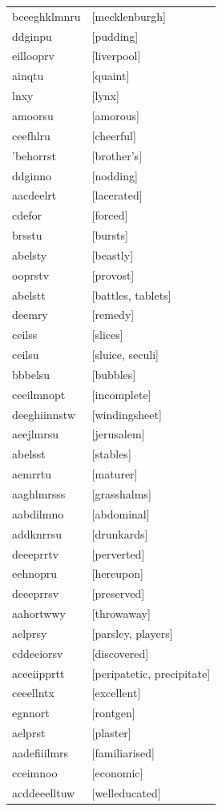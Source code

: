 \documentclass{article}
\begin{document}
\begin{tabular}{ll}
bceeghklmnru & [mecklenburgh] \\
ddginpu & [pudding] \\
eillooprv & [liverpool] \\
ainqtu & [quaint] \\
lnxy & [lynx] \\
amoorsu & [amorous] \\
ceefhlru & [cheerful] \\
'behorrst & [brother's] \\
ddginno & [nodding] \\
aacdeelrt & [lacerated] \\
cdefor & [forced] \\
brsstu & [bursts] \\
abelsty & [beastly] \\
ooprstv & [provost] \\
abelstt & [battles, tablets] \\
deemry & [remedy] \\
ceilss & [slices] \\
ceilsu & [sluice, seculi] \\
bbbelsu & [bubbles] \\
ceeilmnopt & [incomplete] \\
deeghiinnstw & [windingsheet] \\
aeejlmrsu & [jerusalem] \\
abelsst & [stables] \\
aemrrtu & [maturer] \\
aaghlmrsss & [grasshalms] \\
aabdilmno & [abdominal] \\
addknrrsu & [drunkards] \\
deeeprrtv & [perverted] \\
eehnopru & [hereupon] \\
deeeprrsv & [preserved] \\
aahortwwy & [throwaway] \\
aelprsy & [parsley, players] \\
cddeeiorsv & [discovered] \\
aceeiipprtt & [peripatetic, precipitate] \\
ceeellntx & [excellent] \\
egnnort & [rontgen] \\
aelprst & [plaster] \\
aadefiiilmrs & [familiarised] \\
cceimnoo & [economic] \\
acddeeelltuw & [welleducated] \\

\end{tabular}
\end{document}
